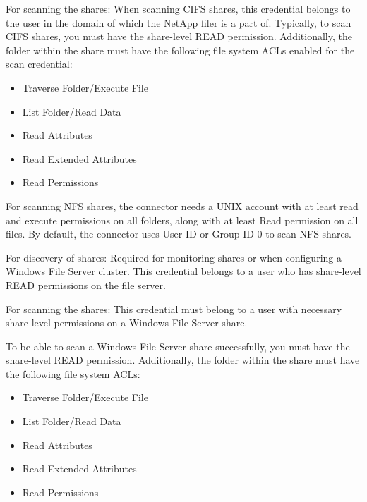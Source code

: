 \documentclass[letterpaper,10pt,english]{sphinxmanual}
\begin{document}
For scanning the shares: When scanning CIFS shares, this credential belongs to the user in the domain of which the NetApp filer is a part of. Typically, to scan CIFS shares, you must have the share-level READ permission. Additionally, the folder within the share must have the following file system ACLs enabled for the scan credential:
\begin{itemize}
\item {} 
Traverse Folder/Execute File

\item {} 
List Folder/Read Data

\item {} 
Read Attributes

\item {} 
Read Extended Attributes

\item {} 
Read Permissions

\end{itemize}

For scanning NFS shares, the connector needs a UNIX account with at least read and execute permissions on all folders, along with at least Read permission on all files. By default, the connector uses User ID or Group ID 0 to scan NFS shares.


For discovery of shares: Required for monitoring shares or when configuring a Windows File Server cluster. This credential belongs to a user who has share-level READ permissions on the file server.

For scanning the shares: This credential must belong to a user with necessary share-level permissions on a Windows File Server share.

To be able to scan a Windows File Server share successfully, you must have the share-level READ permission. Additionally, the folder within the share must have the following file system ACLs:
\begin{itemize}
\item {} 
Traverse Folder/Execute File

\item {} 
List Folder/Read Data

\item {} 
Read Attributes

\item {} 
Read Extended Attributes

\item {} 
Read Permissions

\end{itemize}
\end{document}
